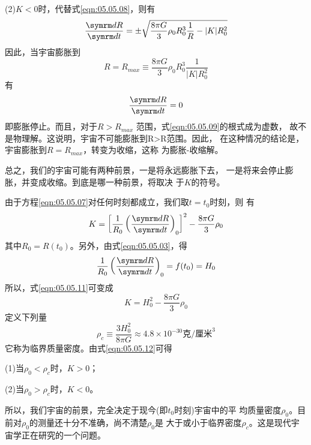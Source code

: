 (2)$ K < 0 $时，代替式\eqref{eqn:05.05.08}，则有
\begin{equation}\label{eqn:05.05.09}
 \frac { \dif R } { \dif t } = \pm \sqrt { \frac { 8 \pi G } { 3 } \rho _ { 0 } R _ { 0 } ^ { 3 } \frac { 1 } { R } - | K | R _ 0 ^ { 2 } }
\end{equation}
因此，当宇宙膨胀到
\begin{equation}\label{eqn:05.05.10}
 R = R _ { max } \equiv \frac { 8 \pi G } { 3 } \rho _ { 0 } R _ { 0 } ^ { 3 } \frac { 1 } { | K | R _ { 0 } ^ 2 }
\end{equation}
有
\begin{equation*}
 \frac { \dif R } { \dif t } = 0
\end{equation*}
即膨胀停止。而且，对于$ R > R _ { max } $ 范围，式\eqref{eqn:05.05.09}的根式成为虚数，
故不是物理解。这说明，宇宙不可能膨胀到R>R范围。因此，
在这种情况的结论是，宇宙膨胀到$ R = R _ { max } $，转变为收缩，这称
为膨胀-收缩解。

总之，我们的宇宙可能有两种前景，一是将永远膨胀下去，
一是将来会停止膨胀，并变成收缩。到底是哪一种前景，将取决
于$ K $的符号。

由于方程\eqref{eqn:05.05.07}对任何时刻都成立，我们取$ t=t_0 $时刻，则
有
\begin{equation}\label{eqn:05.05.11}
 K = \left[ \frac { 1 } { R _ { 0 } } \left( \frac { \dif R } { \dif t } \right) _ 0 \right] ^ { 2 } - \frac { 8 \pi G } { 3 } \rho _ { 0 }
\end{equation}
其中$ R _ { 0 } = R ( t _ { 0 } ) $。另外，由式\eqref{eqn:05.05.03}，得
\begin{equation*}
 \frac { 1 } { R _ { 0 } } \left( \frac { \dif R } { \dif t } \right) _ { 0 } = f ( t _ { 0 } ) = H _ { 0 }
\end{equation*}
所以，式\eqref{eqn:05.05.11}可变成
\clearpage
\begin{equation}\label{eqn:05.05.12}
 K = H _ 0 ^ { 2 } - \frac { 8 \pi G } { 3 } \rho _ { 0 }
\end{equation}
定义下列量
\begin{equation*}
 \rho _ { c } \equiv \frac { 3 H _ 0 ^ { 2 } } { 8 \pi G } \approx 4.8 \times 10 ^ { -30 } \text{克/厘米} ^ 3
\end{equation*}
它称为临界质量密度。由式\eqref{eqn:05.05.12}可得

(1)当$ \rho _ { 0 } < \rho _ { c } $时，$ K > 0 $；

(2)当$ \rho _ { 0 } > \rho _ { c } $时，$ K < 0 $。

\noindent 所以，我们宇宙的前景，完全决定于现今(即$ t _ { 0 } $时刻)宇宙中的平
均质量密度$ \rho _ { 0 } $。目前对$ \rho _ { 0 } $的测量还十分不准确，尚不清楚$ \rho _ { 0 } $是
大于或小于临界密度$ \rho _ { c } $。这是现代宇宙学正在研究的一个问题。